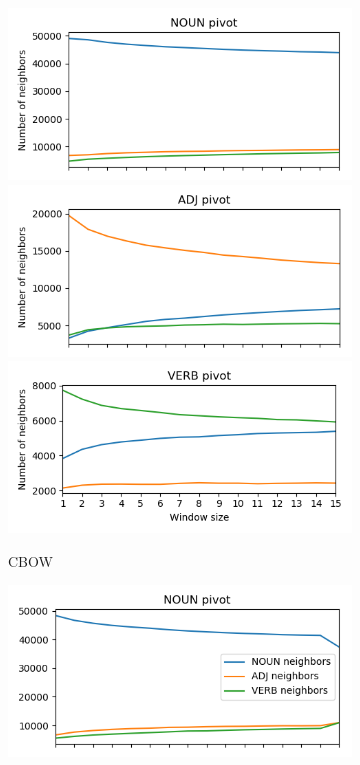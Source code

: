 \documentclass[11pt,a4paper]{article}
\begin{document}
    \begin{figure}[h]
        \begin{subfigure}[b]{.5\textwidth}
        \includegraphics[width=\textwidth]{NOUN_nn_100_fasttext_enwiki-20170501-clean_cbow-300d-min500_pos.png}
        \includegraphics[width=\textwidth]{ADJ_nn_100_fasttext_enwiki-20170501-clean_cbow-300d-min500_pos.png}
        \includegraphics[width=\textwidth]{VERB_nn_100_fasttext_enwiki-20170501-clean_cbow-300d-min500_pos.png}
        \caption{CBOW}
        \end{subfigure}
        \begin{subfigure}[b]{.5\textwidth}
        \includegraphics[width=\textwidth]{NOUN_nn_100_fasttext_enwiki-20170501-clean_skipgram-300d-min500_pos.png}

\end{subfigure}
\end{figure}
\end{document}
